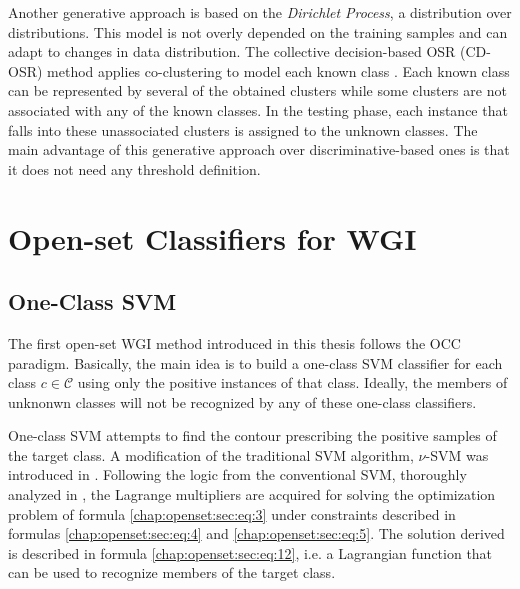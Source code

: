 
Another generative approach is based on the \textit{Dirichlet Process}, a distribution over distributions. This model is not overly depended on the training samples and can adapt to changes in data distribution. The collective decision-based OSR (CD-OSR) method applies co-clustering to model each known class \parencite{geng2018collective}. Each known class can be represented by several of the obtained clusters while some clusters are not associated with any of the known classes. In the testing phase, each instance that falls into these unassociated clusters is assigned to the unknown classes. The main advantage of this generative approach over discriminative-based ones is that it does not need any threshold definition.

\section{Open-set Classifiers for WGI}
\label{chap:openset:sec:Open_set_classifiers_for_WGI}

\subsection{One-Class SVM}\label{chap:openset:sec:OCSVM_description}

The first open-set WGI method introduced in this thesis follows the OCC paradigm. Basically, the main idea is to build a one-class SVM classifier for each class $c \in \mathcal{C}$ using only the positive instances of that class. Ideally, the members of unknonwn classes will not be recognized by any of these one-class classifiers.

One-class SVM attempts to find the contour prescribing the positive samples of the target class. A modification of the traditional SVM algorithm, $\nu$-SVM was introduced in \parencite{scholkopf1999estimating}. Following the logic from the conventional SVM, thoroughly analyzed in \parencite{bishop2006}, the Lagrange multipliers are acquired for solving the optimization problem of formula \ref{chap:openset:sec:eq:3} under constraints described in formulas \ref{chap:openset:sec:eq:4} and \ref{chap:openset:sec:eq:5}. The solution derived is described in formula \ref{chap:openset:sec:eq:12}, i.e. a Lagrangian function that can be used to recognize members of the target class.

